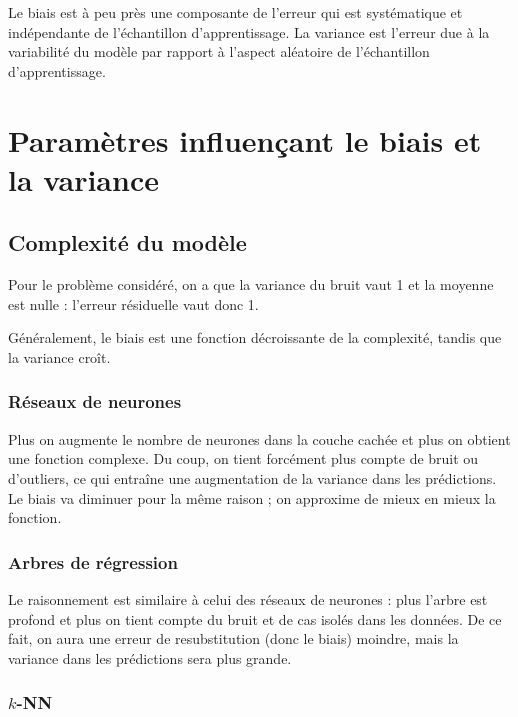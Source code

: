 	Le biais est à peu près une composante de l'erreur qui est systématique et indépendante de l'échantillon d'apprentissage. La variance est l'erreur due à la variabilité du modèle par rapport à l'aspect aléatoire de l'échantillon d'apprentissage.
	
	\section{Paramètres influençant le biais et la variance}
	
		\subsection{Complexité du modèle}
		
		Pour le problème considéré, on a que la variance du bruit vaut 1 et la moyenne est nulle : l'erreur résiduelle vaut donc 1.
		
		
		Généralement, le biais est une fonction décroissante de la complexité, tandis que la variance croît.
		
			\subsubsection{Réseaux de neurones}
		
			
			Plus on augmente le nombre de neurones dans la couche cachée et plus on obtient une fonction complexe. Du coup, on tient forcément plus compte de bruit ou d'outliers, ce qui entraîne une augmentation de la variance dans les prédictions. Le biais va diminuer pour la même raison ; on approxime de mieux en mieux la fonction.
		
			\subsubsection{Arbres de régression}
			
			
			Le raisonnement est similaire à celui des réseaux de neurones : plus l'arbre est profond et plus on tient compte du bruit et de cas isolés dans les données. De ce fait, on aura une erreur de resubstitution (donc le biais) moindre, mais la variance dans les prédictions sera plus grande.
			
			\subsubsection{$k$-NN}
			
